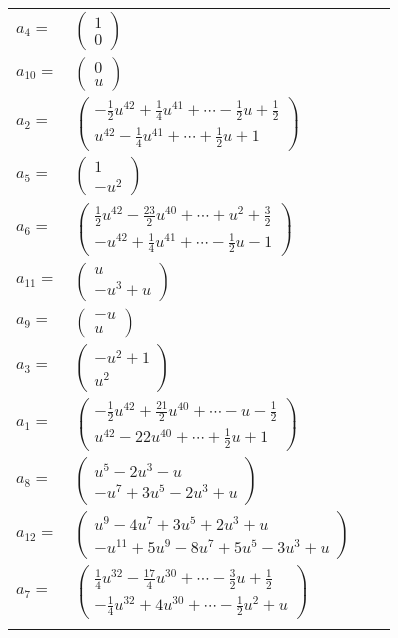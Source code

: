\documentclass[1p]{elsarticle_modified}
\theoremstyle{definition}
\begin{document}
\begin{tabular}{m{7pt} m{180pt} m{7pt} m{180pt} }
\flushright $a_{4}=$&$\begin{pmatrix}1\\0\end{pmatrix}$ \\
\flushright $a_{10}=$&$\begin{pmatrix}0\\u\end{pmatrix}$ \\
\flushright $a_{2}=$&$\begin{pmatrix}-\frac{1}{2} u^{42}+\frac{1}{4} u^{41}+\cdots-\frac{1}{2} u+\frac{1}{2}\\u^{42}-\frac{1}{4} u^{41}+\cdots+\frac{1}{2} u+1\end{pmatrix}$ \\
\flushright $a_{5}=$&$\begin{pmatrix}1\\- u^2\end{pmatrix}$ \\
\flushright $a_{6}=$&$\begin{pmatrix}\frac{1}{2} u^{42}-\frac{23}{2} u^{40}+\cdots+u^2+\frac{3}{2}\\- u^{42}+\frac{1}{4} u^{41}+\cdots-\frac{1}{2} u-1\end{pmatrix}$ \\
\flushright $a_{11}=$&$\begin{pmatrix}u\\- u^3+u\end{pmatrix}$ \\
\flushright $a_{9}=$&$\begin{pmatrix}- u\\u\end{pmatrix}$ \\
\flushright $a_{3}=$&$\begin{pmatrix}- u^2+1\\u^2\end{pmatrix}$ \\
\flushright $a_{1}=$&$\begin{pmatrix}-\frac{1}{2} u^{42}+\frac{21}{2} u^{40}+\cdots- u-\frac{1}{2}\\u^{42}-22 u^{40}+\cdots+\frac{1}{2} u+1\end{pmatrix}$ \\
\flushright $a_{8}=$&$\begin{pmatrix}u^5-2 u^3- u\\- u^7+3 u^5-2 u^3+u\end{pmatrix}$ \\
\flushright $a_{12}=$&$\begin{pmatrix}u^9-4 u^7+3 u^5+2 u^3+u\\- u^{11}+5 u^9-8 u^7+5 u^5-3 u^3+u\end{pmatrix}$ \\
\flushright $a_{7}=$&$\begin{pmatrix}\frac{1}{4} u^{32}-\frac{17}{4} u^{30}+\cdots-\frac{3}{2} u+\frac{1}{2}\\-\frac{1}{4} u^{32}+4 u^{30}+\cdots-\frac{1}{2} u^2+u\end{pmatrix}$\\&\end{tabular}
\end{document}
